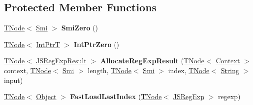 \subsection*{Protected Member Functions}
\begin{DoxyCompactItemize}
\item 
\mbox{\label{classv8_1_1internal_1_1RegExpBuiltinsAssembler_a8f5a4d5402f5a84e3a033eb7fb6f1444}} 
\mbox{\hyperlink{classv8_1_1internal_1_1compiler_1_1TNode}{T\+Node}}$<$ \mbox{\hyperlink{classv8_1_1internal_1_1Smi}{Smi}} $>$ {\bfseries Smi\+Zero} ()
\item 
\mbox{\label{classv8_1_1internal_1_1RegExpBuiltinsAssembler_ac23a7a1ed2450a837b117d4cf3ff4a7d}} 
\mbox{\hyperlink{classv8_1_1internal_1_1compiler_1_1TNode}{T\+Node}}$<$ \mbox{\hyperlink{structv8_1_1internal_1_1IntPtrT}{Int\+PtrT}} $>$ {\bfseries Int\+Ptr\+Zero} ()
\item 
\mbox{\label{classv8_1_1internal_1_1RegExpBuiltinsAssembler_aea6e81b165de8a6698f829efed334fbc}} 
\mbox{\hyperlink{classv8_1_1internal_1_1compiler_1_1TNode}{T\+Node}}$<$ \mbox{\hyperlink{classv8_1_1internal_1_1JSRegExpResult}{J\+S\+Reg\+Exp\+Result}} $>$ {\bfseries Allocate\+Reg\+Exp\+Result} (\mbox{\hyperlink{classv8_1_1internal_1_1compiler_1_1TNode}{T\+Node}}$<$ \mbox{\hyperlink{classv8_1_1internal_1_1Context}{Context}} $>$ context, \mbox{\hyperlink{classv8_1_1internal_1_1compiler_1_1TNode}{T\+Node}}$<$ \mbox{\hyperlink{classv8_1_1internal_1_1Smi}{Smi}} $>$ length, \mbox{\hyperlink{classv8_1_1internal_1_1compiler_1_1TNode}{T\+Node}}$<$ \mbox{\hyperlink{classv8_1_1internal_1_1Smi}{Smi}} $>$ index, \mbox{\hyperlink{classv8_1_1internal_1_1compiler_1_1TNode}{T\+Node}}$<$ \mbox{\hyperlink{classv8_1_1internal_1_1String}{String}} $>$ input)
\item 
\mbox{\label{classv8_1_1internal_1_1RegExpBuiltinsAssembler_af71261ed713089e4b692633f3a3fb153}} 
\mbox{\hyperlink{classv8_1_1internal_1_1compiler_1_1TNode}{T\+Node}}$<$ \mbox{\hyperlink{classv8_1_1internal_1_1Object}{Object}} $>$ {\bfseries Fast\+Load\+Last\+Index} (\mbox{\hyperlink{classv8_1_1internal_1_1compiler_1_1TNode}{T\+Node}}$<$ \mbox{\hyperlink{classv8_1_1internal_1_1JSRegExp}{J\+S\+Reg\+Exp}} $>$ regexp)

\end{DoxyCompactItemize}
